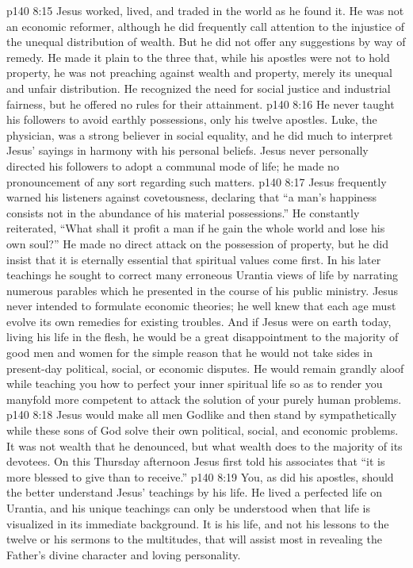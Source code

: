 \vs p140 8:15 \pc {}\bibnobreakspace {} Jesus worked, lived, and traded in the world as he found it. He was not an economic reformer, although he did frequently call attention to the injustice of the unequal distribution of wealth. But he did not offer any suggestions by way of remedy. He made it plain to the three that, while his apostles were not to hold property, he was not preaching against wealth and property, merely its unequal and unfair distribution. He recognized the need for social justice and industrial fairness, but he offered no rules for their attainment.
\vs p140 8:16 He never taught his followers to avoid earthly possessions, only his twelve apostles. Luke, the physician, was a strong believer in social equality, and he did much to interpret Jesus’ sayings in harmony with his personal beliefs. Jesus never personally directed his followers to adopt a communal mode of life; he made no pronouncement of any sort regarding such matters.
\vs p140 8:17 Jesus frequently warned his listeners against covetousness, declaring that \textcolor{ubdarkred}{“a man’s happiness consists not in the abundance of his material possessions.”} He constantly reiterated, \textcolor{ubdarkred}{“What shall it profit a man if he gain the whole world and lose his own soul?”} He made no direct attack on the possession of property, but he did insist that it is eternally essential that spiritual values come first. In his later teachings he sought to correct many erroneous Urantia views of life by narrating numerous parables which he presented in the course of his public ministry. Jesus never intended to formulate economic theories; he well knew that each age must evolve its own remedies for existing troubles. And if Jesus were on earth today, living his life in the flesh, he would be a great disappointment to the majority of good men and women for the simple reason that he would not take sides in present\hyp{}day political, social, or economic disputes. He would remain grandly aloof while teaching you how to perfect your inner spiritual life so as to render you manyfold more competent to attack the solution of your purely human problems.
\vs p140 8:18 \pc Jesus would make all men Godlike and then stand by sympathetically while these sons of God solve their own political, social, and economic problems. It was not wealth that he denounced, but what wealth does to the majority of its devotees. On this Thursday afternoon Jesus first told his associates that \textcolor{ubdarkred}{“it is more blessed to give than to receive.”}
\vs p140 8:19 \pc {}\bibnobreakspace {} You, as did his apostles, should the better understand Jesus’ teachings by his life. He lived a perfected life on Urantia, and his unique teachings can only be understood when that life is visualized in its immediate background. It is his life, and not his lessons to the twelve or his sermons to the multitudes, that will assist most in revealing the Father’s divine character and loving personality.
